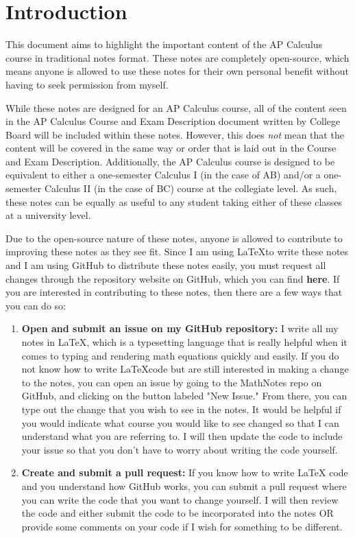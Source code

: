 \documentclass{package/notes}
\begin{document}
\chapter*{Introduction}

This document aims to highlight the important content of the AP Calculus course in traditional notes format. These notes are completely open-source, which means anyone is allowed to use these notes for their own personal benefit without having to seek permission from myself. \newline

While these notes are designed for an AP Calculus course, all of the content seen in the AP Calculus Course and Exam Description document written by College Board will be included within these notes. However, this does \textit{not} mean that the content will be covered in the same way or order that is laid out in the Course and Exam Description. Additionally, the AP Calculus course is designed to be equivalent to either a one-semester Calculus I (in the case of AB) and/or a one-semester Calculus II (in the case of BC) course at the collegiate level. As such, these notes can be equally as useful to any student taking either of these classes at a university level.\newline

Due to the open-source nature of these notes, anyone is allowed to contribute to improving these notes as they see fit. Since I am using \LaTeX to write these notes and I am using GitHub to distribute these notes easily, you must request all changes through the repository website on GitHub, which you can find \textbf{here}. If you are interested in contributing to these notes, then there are a few ways that you can do so:\newline

\begin{enumerate}
	\item \textbf{Open and submit an issue on my GitHub repository:} I write all my notes in \LaTeX, which is a typesetting language that is really helpful when it comes to typing and rendering math equations quickly and easily. If you do not know how to write \LaTeX code but are still interested in making a change to the notes, you can open an issue by going to the MathNotes repo on GitHub, and clicking on the button labeled "New Issue." From there, you can type out the change that you wish to see in the notes. It would be helpful if you would indicate what course you would like to see changed so that I can understand what you are referring to. I will then update the code to include your issue so that you don't have to worry about writing the code yourself.
	\item \textbf{Create and submit a pull request:} If you know how to write LaTeX code and you understand how GitHub works, you can submit a pull request where you can write the code that you want to change yourself. I will then review the code and either submit the code to be incorporated into the notes OR provide some comments on your code if I wish for something to be different. 
\end{enumerate}\newpage
\end{document}
